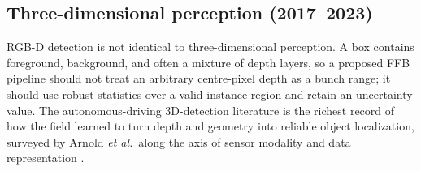 \subsection{Three-dimensional perception (2017--2023)}

RGB-D detection is not identical to three-dimensional perception. A box contains foreground, background, and often a mixture of depth layers, so a proposed FFB pipeline should not treat an arbitrary centre-pixel depth as a bunch range; it should use robust statistics over a valid instance region and retain an uncertainty value. The autonomous-driving 3D-detection literature is the richest record of how the field learned to turn depth and geometry into reliable object localization, surveyed by Arnold \textit{et al.}\ along the axis of sensor modality and data representation \cite{arnold2019survey3d}.


